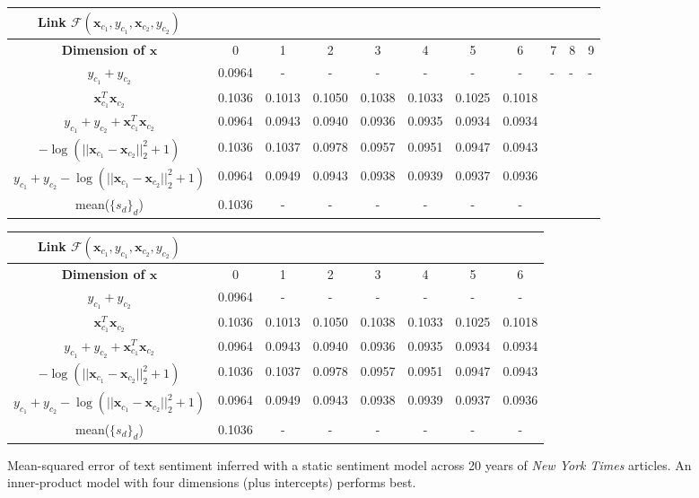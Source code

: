 \begin{figure}
  \begin{tabular}{|c|c|c|c|c|c|c|c|}
   \hline
  Link $\mathcal{F}(\bm x_{c_1}, y_{c_1}, \bm x_{c_2}, y_{c_2})$ & & & & & & \\
  \hline
  \textbf{Dimension of $\bm x$} & 0 & 1 & 2 & 3 & 4 & 5 & 6 & 7 & 8 & 9 \\
  \hline
  $y_{c_1} + y_{c_2}$ & 0.0964 & - & - & - & - & - & - & - & - & - \\
  \hline
  $\bm x_{c_1}^T \bm x_{c_2}$
  & 0.1036 & 0.1013 & 0.1050 & 0.1038 & 0.1033 & 0.1025 & 0.1018 & & & \\
  \hline
  $y_{c_1} + y_{c_2} + \bm x_{c_1}^T \bm x_{c_2}$
  & 0.0964 & 0.0943 & 0.0940 & 0.0936 & 0.0935 & 0.0934 & 0.0934 & & & \\
  \hline
  $-\log(||\bm x_{c_1} - \bm x_{c_2}||_2^2 + 1)$
  & 0.1036 & 0.1037 & 0.0978 & 0.0957 & 0.0951 & 0.0947 & 0.0943 & & & \\
  \hline
  $y_{c_1} + y_{c_2} -\log(||\bm x_{c_1} - \bm x_{c_2}||_2^2 + 1)$
  & 0.0964 & 0.0949 & 0.0943 & 0.0938 & 0.0939 & 0.0937 & 0.0936 & & & \\
  \hline
  mean($\{s_d\}_d$) & 0.1036 & - & - & - & - & - & - & & & \\
  \hline
  \end{tabular}
  \vspace{30pt}
  \begin{tabular}{|c|c|c|c|c|c|c|c|}
   \hline
  Link $\mathcal{F}(\bm x_{c_1}, y_{c_1}, \bm x_{c_2}, y_{c_2})$ & & & \\
  \hline
  \textbf{Dimension of $\bm x$} & 0 & 1 & 2 & 3 & 4 & 5 & 6 \\
  \hline
  $y_{c_1} + y_{c_2}$ & 0.0964 & - & - & - & - & - & - \\
  \hline
  $\bm x_{c_1}^T \bm x_{c_2}$
  & 0.1036 & 0.1013 & 0.1050 & 0.1038 & 0.1033 & 0.1025 & 0.1018 \\
  \hline
  $y_{c_1} + y_{c_2} + \bm x_{c_1}^T \bm x_{c_2}$
  & 0.0964 & 0.0943 & 0.0940 & 0.0936 & 0.0935 & 0.0934 & 0.0934 \\
  \hline
  $-\log(||\bm x_{c_1} - \bm x_{c_2}||_2^2 + 1)$
  & 0.1036 & 0.1037 & 0.0978 & 0.0957 & 0.0951 & 0.0947 & 0.0943 \\
  \hline
  $y_{c_1} + y_{c_2} -\log(||\bm x_{c_1} - \bm x_{c_2}||_2^2 + 1)$
  & 0.0964 & 0.0949 & 0.0943 & 0.0938 & 0.0939 & 0.0937 & 0.0936 \\
  \hline
  mean($\{s_d\}_d$) & 0.1036 & - & - & - & - & - & - \\
  \hline
\end{tabular}
   \caption{Mean-squared error of text sentiment inferred with a
     static sentiment model across 20 years of \emph{New York Times}
     articles. An inner-product model with four dimensions (plus
     intercepts) performs best.}
\end{figure}

